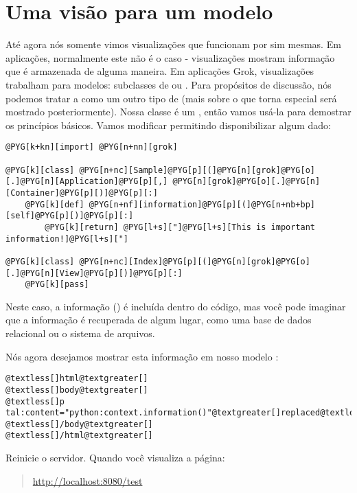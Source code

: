 \documentclass[a4paper,12pt,portuguese]{manual}
\begin{document}
\section{Uma visão para um modelo}

Até agora nós somente vimos visualizações que funcionam por sim
mesmas.
Em aplicações, normalmente este não é o caso - visualizações mostram
informação que é armazenada de alguma maneira. Em aplicações Grok,
visualizações trabalham para modelos: subclasses de  ou
. Para propósitos de discussão, nós podemos tratar a
 como um outro tipo de  (mais sobre o
que torna  especial será mostrado posteriormente).
Nossa classe  é um , então vamos usá-la
para demostrar os princípios básicos. Vamos modificar 
permitindo   disponibilizar algum dado:

\begin{Verbatim}[commandchars=@\[\]]
@PYG[k+kn][import] @PYG[n+nn][grok]

@PYG[k][class] @PYG[n+nc][Sample]@PYG[p][(]@PYG[n][grok]@PYG[o][.]@PYG[n][Application]@PYG[p][,] @PYG[n][grok]@PYG[o][.]@PYG[n][Container]@PYG[p][)]@PYG[p][:]
    @PYG[k][def] @PYG[n+nf][information]@PYG[p][(]@PYG[n+nb+bp][self]@PYG[p][)]@PYG[p][:]
        @PYG[k][return] @PYG[l+s]["]@PYG[l+s][This is important information!]@PYG[l+s]["]

@PYG[k][class] @PYG[n+nc][Index]@PYG[p][(]@PYG[n][grok]@PYG[o][.]@PYG[n][View]@PYG[p][)]@PYG[p][:]
    @PYG[k][pass]
\end{Verbatim}

Neste caso, a informação () é
incluída dentro do código, mas você pode imaginar que a informação é
recuperada de algum lugar, como uma base de dados relacional ou o
sistema de arquivos.

Nós agora desejamos mostrar esta informação em nosso modelo
:

\begin{Verbatim}[commandchars=@\[\]]
@textless[]html@textgreater[]
@textless[]body@textgreater[]
@textless[]p tal:content="python:context.information()"@textgreater[]replaced@textless[]/p@textgreater[]
@textless[]/body@textgreater[]
@textless[]/html@textgreater[]
\end{Verbatim}

Reinicie o servidor. Quando você visualiza a página:
\begin{quote}

\href{http://localhost:8080/test}{http://localhost:8080/test}
\end{quote}
\end{document}
